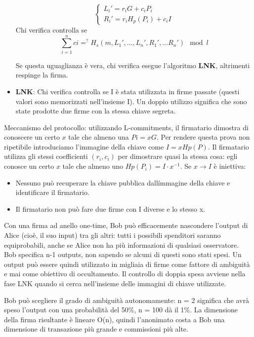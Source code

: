\begin{itemize}
\[ \begin{cases}
L_i' = r_iG + c_iP_i \\
R_i' = r_iH_p(P_i) + c_iI
\end{cases}
 \] Chi verifica controlla se
\[\sum_{i=1}^{n} ci =^? H_s(m,L_1',...,L_n',R_1',...R_n') \mod l \]

Se questa uguaglianza è vera, chi verifica esegue
l'algoritmo \textbf{LNK}, altrimenti respinge la firma.
\item 
  \textbf{LNK}: Chi verifica controlla se I è stata utilizzata in firme
passate (questi valori sono memorizzati nell'insieme I).
Un doppio utilizzo significa che sono state prodotte due firme con la
stessa chiave segreta.
\end{itemize}

Meccanismo del protocollo: utilizzando L-commitments, il firmatario
dimostra di conoscere un certo $x$ tale che almeno una $Pi = xG$.
Per rendere questa prova non ripetibile introduciamo l'immagine
della chiave come $I=xHp(P)$. Il firmatario utilizza gli stessi
coefficienti $(r_i,c_i)$ per dimostrare quasi la stessa cosa: egli conosce
un certo $x$ tale che almeno uno $Hp(P_i)=I \cdot x^{-1}$. Se $x \rightarrow I$ è iniettiva:

\begin{itemize}
\item 
  Nessuno può recuperare la chiave pubblica dall\'immagine della chiave e identificare il firmatario.
\item 
  Il firmatario non può fare due firme con I diverse e lo stesso x.
\end{itemize}

Con una firma ad anello one-time, Bob può efficacemente nascondere
l'output di Alice (cioè, il suo input) tra gli altri: tutti i possibili
spenditori saranno equiprobabili, anche se Alice non ha più informazioni
di qualsiasi osservatore. Bob specifica n-1 outputs, non sapendo se
alcuni di questi sono stati spesi.
Un output può essere quindi utilizzato in migliaia di firme come fattore di
ambiguità e mai come obiettivo di occultamento. Il controllo di doppia
spesa avviene nella fase LNK quando si cerca
nell'insieme delle immagini di chiave utilizzate.

Bob può scegliere il grado di ambiguità autonomamente: n = 2 significa
che avrà speso l'output con una probabilità del 50\%, n
= 100 dà il 1\%. La dimensione della firma risultante è lineare O(n),
quindi l'anonimato costa a Bob una dimensione di
transazione più grande e commissioni più alte.

